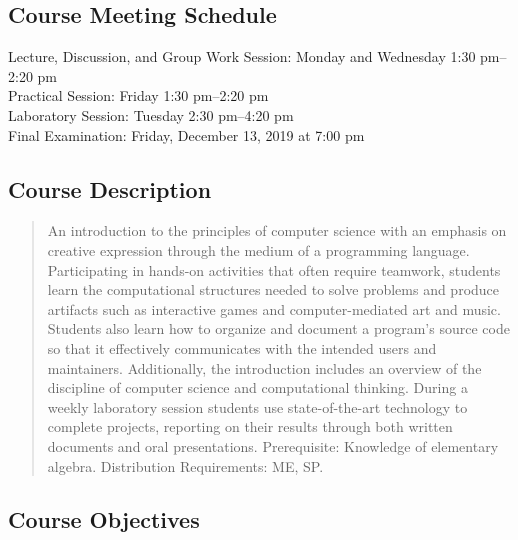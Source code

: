 \documentclass[11pt]{article}
\begin{document}
\subsection*{Course Meeting Schedule}

Lecture, Discussion, and Group Work Session: Monday and Wednesday 1:30 pm--2:20 pm \\
Practical Session: Friday 1:30 pm--2:20 pm \\
Laboratory Session: Tuesday 2:30 pm--4:20 pm \\
Final Examination: Friday, December 13, 2019 at 7:00 pm

\subsection*{Course Description}

\begin{quote}

An introduction to the principles of computer science with an emphasis on
creative expression through the medium of a programming language. Participating
in hands-on activities that often require teamwork, students learn the
computational structures needed to solve problems and produce artifacts such as
interactive games and computer-mediated art and music. Students also learn how
to organize and document a program's source code so that it effectively
communicates with the intended users and maintainers. Additionally, the
introduction includes an overview of the discipline of computer science and
computational thinking. During a weekly laboratory session students use
state-of-the-art technology to complete projects, reporting on their results
through both written documents and oral presentations.
Prerequisite: Knowledge of elementary algebra.
Distribution Requirements: ME, SP.\@ \\

\end{quote}

\subsection*{Course Objectives}
\end{document}
